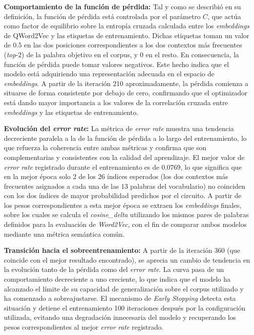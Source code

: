 \textbf{Comportamiento de la función de pérdida:} Tal y como se describió en su definición, la función de pérdida está controlada por el parámetro $C$, que actúa como factor de equilibrio sobre la entropía cruzada calculada entre los \textit{embeddings} de QWord2Vec y las etiquetas de entrenamiento. Dichas etiquetas toman un valor de $0.5$ en las dos posiciones correspondientes a los dos contextos más frecuentes (\textit{top}-$2$) de la palabra objetivo en el corpus, y $0$ en el resto. En consecuencia, la función de pérdida puede tomar valores negativos. Este hecho indica que el modelo está adquiriendo una representación adecuada en el espacio de \textit{embeddings}. A partir de la iteración 210 aproximadamente, la pérdida comienza a situarse de forma consistente por debajo de cero, confirmando que el optimizador está dando mayor importancia a los valores de la correlación cruzada entre \textit{embeddings} y las etiquetas de entrenamiento.

\textbf{Evolución del \textit{error rate}:} La métrica de \textit{error rate} muestra una tendencia decreciente paralela a la de la función de pérdida a lo largo del entrenamiento, lo que refuerza la coherencia entre ambas métricas y confirma que son complementarias y consistentes con la calidad del aprendizaje. El mejor valor de \textit{error rate} registrado durante el entrenamiento es de $0.0769$, lo que significa que en la mejor época solo $2$ de los $26$ índices esperados (los dos contextos más frecuentes asignados a cada una de las $13$ palabras del vocabulario) no coinciden con los dos índices de mayor probabilidad predichos por el circuito. A partir de los pesos correspondientes a esta mejor época se extraen los \textit{embeddings} finales, sobre los cuales se calcula el \textit{cosine\_delta} utilizando los mismos pares de palabras definidos para la evaluación de \textit{Word2Vec}, con el fin de comparar ambos modelos mediante una métrica semántica común.

\textbf{Transición hacia el sobreentrenamiento:} A partir de la iteración 360 (que coincide con el mejor resultado encontrado), se aprecia un cambio de tendencia en la evolución tanto de la pérdida como del \textit{error rate}. La curva pasa de un comportamiento decreciente a uno creciente, lo que indica que el modelo ha alcanzado el límite de su capacidad de generalización sobre el corpus utilizado y ha comenzado a sobreajustarse. El mecanismo de \textit{Early Stopping} detecta esta situación y detiene el entrenamiento 100 iteraciones después por la configuración utilizada, evitando una degradación innecesaria del modelo y recuperando los pesos correspondientes al mejor \textit{error rate} registrado.

